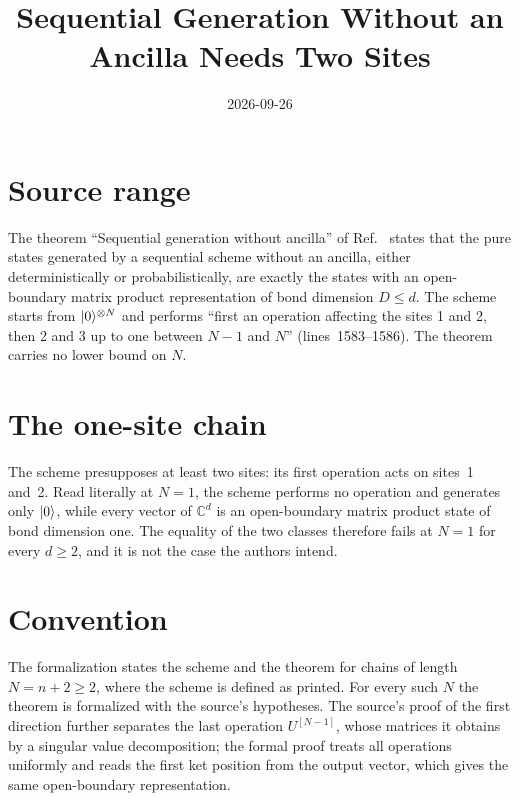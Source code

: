 \documentclass{article}
\title{Sequential Generation Without an Ancilla Needs Two Sites}
\author{}
\date{2026-09-26}
\begin{document}
\maketitle
{}

\section{Source range}

The theorem ``Sequential generation without ancilla'' of
Ref.~\cite[Section~5, lines~1580--1616]{PerezGarcia2007Matrix} states that
the pure states generated by a sequential scheme without an ancilla, either
deterministically or probabilistically, are exactly the states with an
open-boundary matrix product representation of bond dimension $D\leq d$. The
scheme starts from $|0\rangle^{\otimes N}$ and performs ``first an operation
affecting the sites 1 and 2, then 2 and 3 up to one between $N-1$ and $N$''
(lines~1583--1586). The theorem carries no lower bound on $N$.

\section{The one-site chain}

The scheme presupposes at least two sites: its first operation acts on
sites~1 and~2. Read literally at $N=1$, the scheme performs no operation and
generates only $|0\rangle$, while every vector of $\mathbb{C}^d$ is an
open-boundary matrix product state of bond dimension one. The equality of the
two classes therefore fails at $N=1$ for every $d\geq2$, and it is not the
case the authors intend.

\section{Convention}

The formalization states the scheme and the theorem for chains of length
$N=n+2\geq2$, where the scheme is defined as printed. For every such $N$ the
theorem is formalized with the source's hypotheses. The source's proof of the
first direction further separates the last operation $U^{[N-1]}$, whose
matrices it obtains by a singular value decomposition; the formal proof
treats all operations uniformly and reads the first ket position from the
output vector, which gives the same open-boundary representation.



\end{document}
